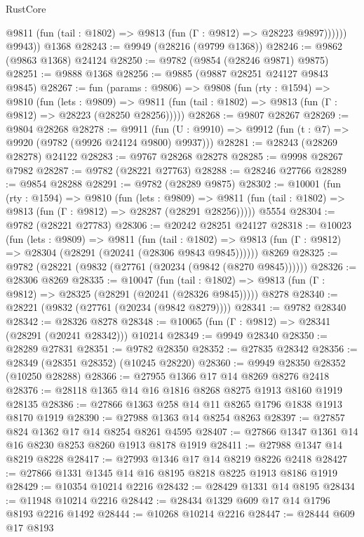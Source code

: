 \begin{lexlean}{RustCore}
\begin{coremodule}
              @9811 (fun (tail : @1802) => @9813 (fun (Γ : @9812) => @28223 @9897))))))
        @9943))
    @1368
@28243 := @9949 (@28216 (@9799 @1368))
@28246 := @9862 (@9863 @1368) @24124
@28250 := @9782 (@9854 (@28246 @9871) @9875)
@28251 := @9888 @1368
@28256 := @9885 (@9887 @28251 @24127 @9843 @9845)
@28267 := fun (params : @9806) =>
  @9808
    (fun (rty : @1594) =>
    @9810
      (fun (lets : @9809) =>
      @9811 (fun (tail : @1802) => @9813 (fun (Γ : @9812) => @28223 (@28250 @28256)))))
@28268 := @9807 @28267
@28269 := @9804 @28268
@28278 := @9911
    (fun (U : @9910) => @9912 (fun (t : @7) => @9920 (@9782 (@9926 @24124 @9800) @9937)))
@28281 := @28243 (@28269 @28278) @24122
@28283 := @9767 @28268 @28278
@28285 := @9998 @28267 @7982
@28287 := @9782 (@28221 @27763)
@28288 := @28246 @27766
@28289 := @9854 @28288
@28291 := @9782 (@28289 @9875)
@28302 := @10001
    (fun (rty : @1594) =>
    @9810
      (fun (lets : @9809) =>
      @9811 (fun (tail : @1802) => @9813 (fun (Γ : @9812) => @28287 (@28291 @28256)))))
    @5554
@28304 := @9782 (@28221 @27783)
@28306 := @20242 @28251 @24127
@28318 := @10023
    (fun (lets : @9809) =>
    @9811
      (fun (tail : @1802) =>
      @9813 (fun (Γ : @9812) => @28304 (@28291 (@20241 (@28306 @9843 @9845))))))
    @8269
@28325 := @9782 (@28221 (@9832 (@27761 (@20234 (@9842 (@8270 @9845))))))
@28326 := @28306 @8269
@28335 := @10047
    (fun (tail : @1802) => @9813 (fun (Γ : @9812) => @28325 (@28291 (@20241 (@28326 @9845)))))
    @8278
@28340 := @28221 (@9832 (@27761 (@20234 (@9842 @8279))))
@28341 := @9782 @28340
@28342 := @28326 @8278
@28348 := @10065 (fun (Γ : @9812) => @28341 (@28291 (@20241 @28342))) @10214
@28349 := @9949 @28340
@28350 := @28289 @27831
@28351 := @9782 @28350
@28352 := @27835 @28342
@28356 := @28349 (@28351 @28352) (@10245 @28220)
@28360 := @9949 @28350 @28352 (@10250 @28288)
@28366 := @27955 @1366 @17 @14 @8269 @8276 @2418
@28376 := @28118 @1365 @14 @16 @1816 @8268 @8275 @1913 @8160 @1919 @28135
@28386 := @27866 @1363 @258 @14 @11 @8265 @1796 @1838 @1913 @8170 @1919
@28390 := @27988 @1363 @14 @8254 @8263
@28397 := @27857 @824 @1362 @17 @14 @8254 @8261 @4595
@28407 := @27866 @1347 @1361 @14 @16 @8230 @8253 @8260 @1913 @8178 @1919
@28411 := @27988 @1347 @14 @8219 @8228
@28417 := @27993 @1346 @17 @14 @8219 @8226 @2418
@28427 := @27866 @1331 @1345 @14 @16 @8195 @8218 @8225 @1913 @8186 @1919
@28429 := @10354 @10214 @2216
@28432 := @28429 @1331 @14 @8195
@28434 := @11948 @10214 @2216
@28442 := @28434 @1329 @609 @17 @14 @1796 @8193 @2216 @1492
@28444 := @10268 @10214 @2216
@28447 := @28444 @609 @17 @8193

\end{coremodule}
\end{lexlean}
